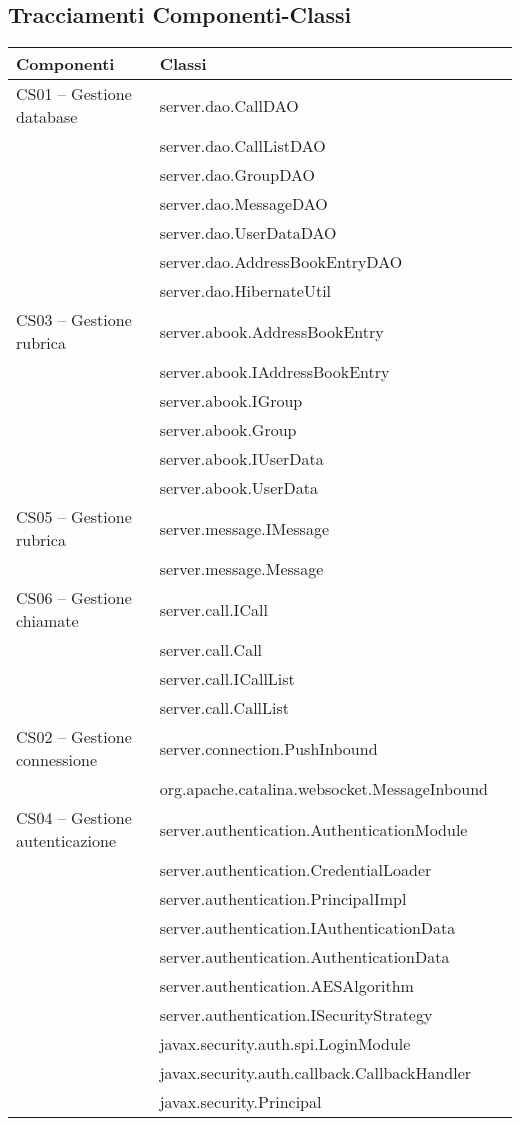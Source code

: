 \subsection{Tracciamenti Componenti-Classi}\label{sec:tracCompClass}

\begin{center}
\begin{longtable}{lp{}l}
\toprule Componenti & Classi\\
\midrule
CS01 -- Gestione database
& server.dao.CallDAO\\
& server.dao.CallListDAO\\
& server.dao.GroupDAO\\
& server.dao.MessageDAO\\
& server.dao.UserDataDAO\\
& server.dao.AddressBookEntryDAO\\
& server.dao.HibernateUtil\\

CS03 -- Gestione rubrica & server.abook.AddressBookEntry\\
& server.abook.IAddressBookEntry\\
& server.abook.IGroup\\
& server.abook.Group\\
& server.abook.IUserData\\
& server.abook.UserData\\

CS05 -- Gestione rubrica & server.message.IMessage\\
& server.message.Message\\

CS06 -- Gestione chiamate
 & server.call.ICall\\
& server.call.Call\\
 & server.call.ICallList\\
& server.call.CallList\\

CS02 -- Gestione connessione & server.connection.PushInbound\\
& org.apache.catalina.websocket.MessageInbound\\

CS04 -- Gestione autenticazione & server.authentication.AuthenticationModule\\
& server.authentication.CredentialLoader\\
& server.authentication.PrincipalImpl\\
& server.authentication.IAuthenticationData\\
& server.authentication.AuthenticationData\\
& server.authentication.AESAlgorithm\\
& server.authentication.ISecurityStrategy\\
& javax.security.auth.spi.LoginModule\\
& javax.security.auth.callback.CallbackHandler\\
& javax.security.Principal\\


\end{longtable}
\end{center}
